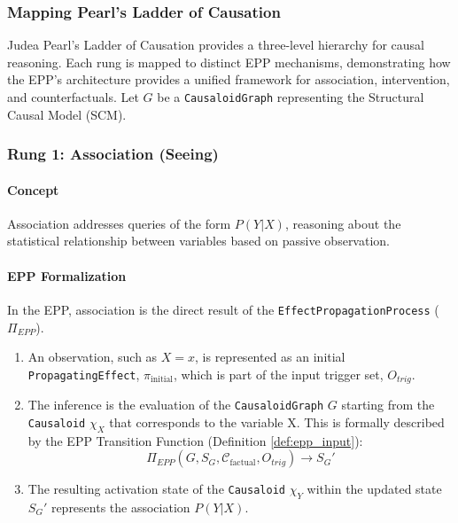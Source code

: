 

\subsubsection{Mapping Pearl's Ladder of Causation}
\label{subsec:formalization_mapping_pearl}

Judea Pearl's Ladder of Causation \cite{pearl2000causality} provides a three-level hierarchy for causal reasoning. Each rung is mapped to distinct EPP mechanisms, demonstrating how the EPP's architecture provides a unified framework for association, intervention, and counterfactuals. Let \(G\) be a \texttt{CausaloidGraph} representing the Structural Causal Model (SCM).

\subsubsection*{Rung 1: Association (Seeing)}
\label{sssec:mapping_pearl_rung1}

\paragraph{Concept}
Association addresses queries of the form \(P(Y|X)\), reasoning about the statistical relationship between variables based on passive observation.

\paragraph{EPP Formalization}
In the EPP, association is the direct result of the \texttt{EffectPropagationProcess} (\(\Pi_{EPP}\)).
\begin{enumerate}
    
    \item An observation, such as \(X=x\), is represented as an initial \texttt{PropagatingEffect}, \(\pi_{\text{initial}}\), which is part of the input trigger set, \(O_{trig}\).
    
    \item The inference is the evaluation of the \texttt{CausaloidGraph} \(G\) starting from the \texttt{Causaloid} \(\chi_X\) that corresponds to the variable X. This is formally described by the EPP Transition Function (Definition \ref{def:epp_input}):
    \[ \Pi_{EPP}(G, S_G, \mathcal{C}_{\text{factual}}, O_{trig}) \to S_G' \]
    \item The resulting activation state of the \texttt{Causaloid} \(\chi_Y\) within the updated state \(S_G'\) represents the association \(P(Y|X)\).
\end{enumerate}


